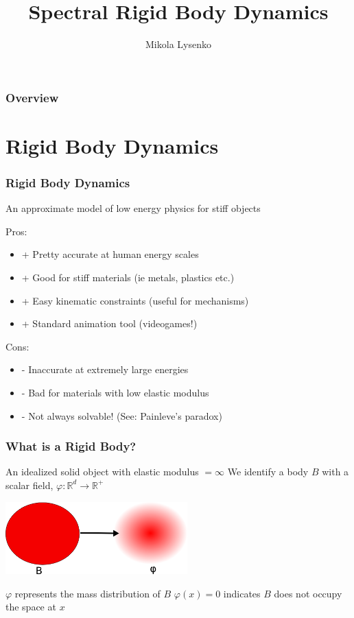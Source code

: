\documentclass{beamer}
\title{Spectral Rigid Body Dynamics}
\author{Mikola Lysenko}
\begin{document}
\newcommand{\R}{\mathbb{R}}
\newcommand{\ind}[1]{{\bf 1}_{#1}}

\maketitle

\begin{frame}
	\frametitle{Overview}
		\tableofcontents
\end{frame}

\section{Rigid Body Dynamics}
\begin{frame}
\frametitle{Rigid Body Dynamics}
An approximate model of low energy physics for stiff objects

\pause
\vskip15pt
Pros:
\begin{itemize}
	\item{+} Pretty accurate at human energy scales
	\item{+} Good for stiff materials (ie metals, plastics etc.)
	\item{+} Easy kinematic constraints (useful for mechanisms)
	\item{+} Standard animation tool (videogames!)
\end{itemize}

\pause
\vskip15pt
Cons:
\begin{itemize}
	\item{-} Inaccurate at extremely large energies
	\item{-} Bad for materials with low elastic modulus
	\item{-} Not always solvable! (See: Painleve's paradox)
\end{itemize}
\end{frame}

\begin{frame}
\frametitle{What is a Rigid Body?}
An idealized solid object with elastic modulus $= \infty$
\pause
\vskip5pt
We identify a body $B$ with a scalar field, $\varphi : \R^d \to \R^+$
\vskip5pt
\begin{center}
\includegraphics[height=1.1in]{figures/massfield.png}
\end{center}
\pause
\vskip5pt
$\varphi$ represents the mass distribution of $B$
\pause
\vskip5pt
$\varphi(x) = 0$ indicates $B$ does not occupy the space at $x$
\end{frame}
\end{document}
